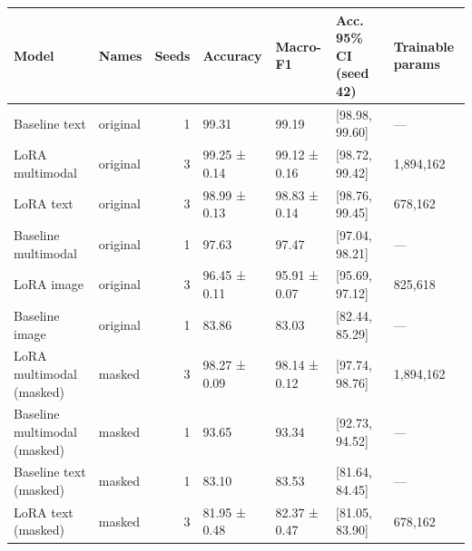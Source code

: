 \begin{tabular}{llrllll}
\toprule
Model & Names & Seeds & Accuracy & Macro-F1 & Acc. 95\% CI (seed 42) & Trainable params \\
\midrule
Baseline text & original & 1 & 99.31 & 99.19 & [98.98, 99.60] & — \\
LoRA multimodal & original & 3 & 99.25 ± 0.14 & 99.12 ± 0.16 & [98.72, 99.42] & 1,894,162 \\
LoRA text & original & 3 & 98.99 ± 0.13 & 98.83 ± 0.14 & [98.76, 99.45] & 678,162 \\
Baseline multimodal & original & 1 & 97.63 & 97.47 & [97.04, 98.21] & — \\
LoRA image & original & 3 & 96.45 ± 0.11 & 95.91 ± 0.07 & [95.69, 97.12] & 825,618 \\
Baseline image & original & 1 & 83.86 & 83.03 & [82.44, 85.29] & — \\
LoRA multimodal (masked) & masked & 3 & 98.27 ± 0.09 & 98.14 ± 0.12 & [97.74, 98.76] & 1,894,162 \\
Baseline multimodal (masked) & masked & 1 & 93.65 & 93.34 & [92.73, 94.52] & — \\
Baseline text (masked) & masked & 1 & 83.10 & 83.53 & [81.64, 84.45] & — \\
LoRA text (masked) & masked & 3 & 81.95 ± 0.48 & 82.37 ± 0.47 & [81.05, 83.90] & 678,162 \\
\bottomrule
\end{tabular}
